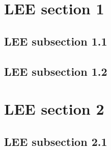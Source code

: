 \section{LEE section 1}

\subsection{LEE subsection 1.1}


\subsection{LEE subsection 1.2}


\section{LEE section 2}


\subsection{LEE subsection 2.1}

